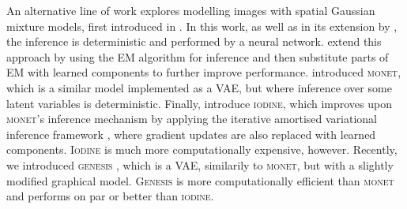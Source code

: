 An alternative line of work explores modelling images with spatial Gaussian mixture models, first introduced in \cite{Greff2016tagger}.
In this work, as well as in its extension by \cite{Ilin2017recurrentln}, the inference is deterministic and performed by a neural network.
\cite{Greff2017neuralem,Steenkiste2018rnem} extend this approach by using the \gls{EM} algorithm for inference and then substitute parts of \gls{EM} with learned components to further improve performance.
\cite{Burgess2019monet} introduced \textsc{monet}, which is a similar model implemented as a \gls{VAE}, but where inference over some latent variables is deterministic.
Finally, \cite{Greff2019multi} introduce \textsc{iodine}, which improves upon \textsc{monet}'s inference mechanism by applying the iterative amortised variational inference framework \citep{Marino2018iavi}, where gradient updates are also replaced with learned components.
\textsc{Iodine} is much more computationally expensive, however.
Recently, we introduced \textsc{genesis} \citep{Engelcke2019genesis}, which is a \gls{VAE}, similarily to \textsc{monet}, but with a slightly modified graphical model.
\textsc{Genesis} is more computationally efficient than \textsc{monet} and performs on par or better than \textsc{iodine}.